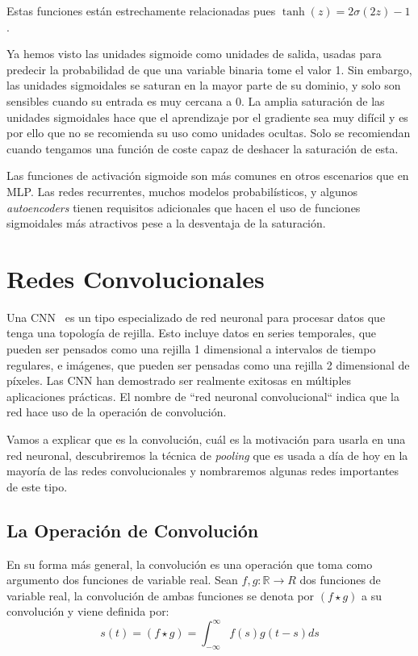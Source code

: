 Estas funciones están estrechamente relacionadas pues $\tanh{(z)=2\sigma(2z)-1}$.

Ya hemos visto las unidades sigmoide como unidades de salida, usadas para predecir la probabilidad de que una variable binaria tome el valor 1. Sin embargo, las unidades sigmoidales se saturan en la mayor parte de su dominio, y solo son sensibles cuando su entrada es muy cercana a 0. La amplia saturación de las unidades sigmoidales hace que el aprendizaje por el gradiente sea muy difícil y es por ello que no se recomienda su uso como unidades ocultas. Solo se recomiendan cuando tengamos una función de coste capaz de deshacer la saturación de esta.

Las funciones de activación sigmoide son más comunes en otros escenarios que en \ac{MLP}. Las redes recurrentes, muchos modelos probabilísticos, y algunos \textit{autoencoders} tienen requisitos adicionales que hacen el uso de funciones sigmoidales más atractivos pese a la desventaja de la saturación.

\section{Redes Convolucionales}
Una \ac{CNN}~\cite{Goodfellow-et-al-2016} es un tipo especializado de red neuronal para procesar datos que tenga una topología de rejilla. Esto incluye datos en series temporales, que pueden ser pensados como una rejilla 1 dimensional a intervalos de tiempo regulares, e imágenes, que pueden ser pensadas como una rejilla 2 dimensional de píxeles. Las \ac{CNN} han demostrado ser realmente exitosas en múltiples aplicaciones prácticas. El nombre de ``red neuronal convolucional`` indica que la red hace uso de la operación de convolución. 

Vamos a explicar que es la convolución, cuál es la motivación para usarla en una red neuronal, descubriremos la técnica de \textit{pooling} que es usada a día de hoy en la mayoría de las redes convolucionales y nombraremos algunas redes importantes de este tipo.

\subsection{La Operación de Convolución}
En su forma más general, la convolución es una operación que toma como argumento dos funciones de variable real. Sean $f, g: \mathbb{R} \to {R}$ dos funciones de variable real, la convolución de ambas funciones se denota por $(f \star g)$ a su convolución y viene definida por:
\begin{equation}
    s(t) = (f \star g) = \int_{-\infty}^{\infty}f(s)g(t-s)ds
\end{equation}

